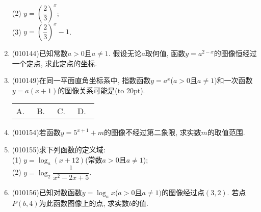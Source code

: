 \documentclass[10pt,a4paper]{article}
\newcommand{\bracket}[1]{(\hbox to #1pt{})}
\newcommand{\fourch}[4]{\par\begin{tabular}{p{.23\textwidth}p{.23\textwidth}p{.23\textwidth}p{.23\textwidth}}
A.~#1 &B.~#2& C.~#3& D.~#4
\end{tabular}}
\begin{document}
\begin{enumerate}[1.]
(2) $y=(\dfrac 23)^x$;\\
(3) $y=(\dfrac 23)^x-1$.
\item {\tiny (010144)}已知常数$a>0$且$a\ne 1$. 假设无论$a$取何值, 函数$y=a^{2-x}$的图像恒经过一个定点, 求此定点的坐标.
\item {\tiny (010149)}在同一平面直角坐标系中, 指数函数$y=a^x$($a>0$且$a\ne 1$)和一次函数$y=a(x+1)$的图像关系可能是\bracket{20}.
\fourch{\begin{tikzpicture}[>=latex,scale=0.7]
\draw [->] (-2,0) -- (2,0) node [below] {$x$};
\draw [->] (0,-1) -- (0,2.5) node [left] {$y$};
\draw (0,0) node [below left] {$O$};
\draw [domain = -2:1.3] plot (-\x,{pow(2,\x)});
\draw (-1.5,-1) -- (0.25,2.5);
\draw (0.2,1) -- (0,1) node [below left] {$1$};
\draw (-1,0.2) -- (-1,0) node [above left] {$-1$};
\end{tikzpicture}}{\begin{tikzpicture}[>=latex,scale=0.7]
\draw [->] (-2,0) -- (2,0) node [below] {$x$};
\draw [->] (0,-1) -- (0,2.5) node [left] {$y$};
\draw (0,0) node [below left] {$O$};
\draw [domain = -2:1.3] plot (-\x,{pow(2,\x)});
\draw (-1,-1) -- (2,0.5);
\draw (0.2,1) -- (0,1) node [below left] {$1$};
\draw (1,0.2) -- (1,0) node [below] {$1$};
\end{tikzpicture}}{\begin{tikzpicture}[>=latex,scale=0.7]
\draw [->] (-2,0) -- (2,0) node [below] {$x$};
\draw [->] (0,-1) -- (0,2.5) node [left] {$y$};
\draw (0,0) node [below left] {$O$};
\draw [domain = -2:1.3] plot (\x,{pow(2,\x)});
\draw (-1.5,-1) -- (0.25,2.5);
\draw (0.2,1) -- (0,1) node [below right] {$1$};
\draw (-1,0.2) -- (-1,0) node [below left] {$-1$};
\end{tikzpicture}}{\begin{tikzpicture}[>=latex,scale=0.7]
\draw [->] (-2,0) -- (2,0) node [below] {$x$};
\draw [->] (0,-1) -- (0,2.5) node [left] {$y$};
\draw (0,0) node [below left] {$O$};
\draw [domain = -2:1.3] plot (\x,{pow(2,\x)});
\draw (-2,-0.5) -- (2,1.5);
\draw (0.2,1) -- (0,1) node [above left] {$1$};
\draw (-1,0.2) -- (-1,0) node [below] {$-1$};
\end{tikzpicture}}
\item {\tiny (010154)}若函数$y=5^{x+1}+m$的图像不经过第二象限, 求实数$m$的取值范围.
\item {\tiny (010155)}求下列函数的定义域:\\
(1) $y=\log_a (x+12)$(常数$a>0$且$a\ne 1$);\\
(2) $y=\log_2\dfrac1{x^2-2x+5}$.
\item {\tiny (010156)}已知对数函数$y=\log_ax$($a>0$且$a\ne 1)$的图像经过点$(3, 2)$. 若点$P(b, 4)$为此函数图像上的点, 求实数$b$的值.

\end{enumerate}
\end{document}
